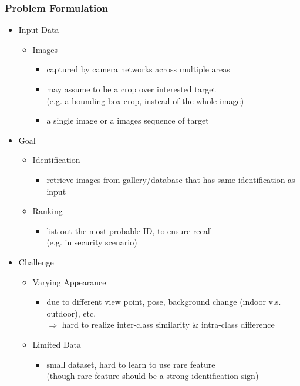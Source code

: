 \subsubsection{Problem Formulation}
\begin{itemize}
\item Input Data
	\begin{itemize}
	\item Images
		\begin{itemize}
		\item captured by camera networks across multiple areas
		\item may assume to be a crop over interested target \\
		(e.g. a bounding box crop, instead of the whole image)
		\item a single image or a images sequence of target
		\end{itemize}
	\end{itemize}
\item Goal
	\begin{itemize}
	\item Identification
		\begin{itemize}
		\item retrieve images from gallery/database that has same identification as input
		\end{itemize}
	\item Ranking
		\begin{itemize}
		\item list out the most probable ID, to ensure recall \\
		(e.g. in security scenario)
		\end{itemize}
	\end{itemize}
\item Challenge
	\begin{itemize}
	\item Varying Appearance
		\begin{itemize}
		\item due to different view point, pose, background change (indoor v.s. outdoor), etc. \\
		$\Rightarrow$ hard to realize inter-class similarity \& intra-class difference
		\end{itemize}
	\item Limited Data
		\begin{itemize}
		\item small dataset, hard to learn to use rare feature \\
		(though rare feature should be a strong identification sign)

\end{itemize}
\end{itemize}
\end{itemize}
